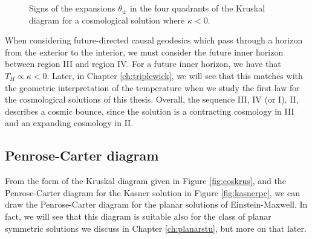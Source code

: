 \begin{figure}[!h]
\centering
{}
\caption[Signs of the expansions $\theta_\pm$ in the four quadrants of the Kruskal diagram for a cosmological solutions]{Signs of the expansions $\theta_\pm$ in the four quadrants of the Kruskal diagram for a cosmological solution where $\kappa < 0$.}
\label{fig:flipped}
\end{figure}


When considering future-directed causal geodesics which pass through a horizon from the exterior to the interior, we must consider the future inner horizon between region III and region IV. For a future inner horizon, we have that $T_H \propto \kappa < 0$. Later, in Chapter \ref{ch:triplewick}, we will see that this matches with the geometric interpretation of the temperature when we study the first law for the cosmological solutions of this thesis. Overall, the sequence III, IV (or I), II, describes a cosmic bounce, since the solution is a contracting cosmology in III and an expanding cosmology in II. 

\subsection{Penrose-Carter diagram}

From the form of the Kruskal diagram given in Figure \ref{fig:coskrus}, and the Penrose-Carter diagram for the Kasner solution in Figure \ref{fig:kasnerpc}, we can draw the Penrose-Carter diagram for the planar solutions of Einstein-Maxwell. In fact, we will see that this diagram is suitable also for the class of planar symmetric solutions we discuss in Chapter \ref{ch:planarstu}, but more on that later.


